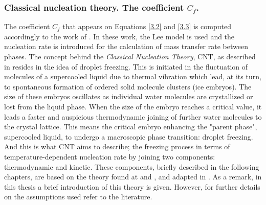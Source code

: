 \subsubsection{Classical nucleation theory. The coefficient $C_f$.}
The coefficient $C_f$ that appears on Equations \ref{3.2} and \ref{3.3} is computed accordingly to the work of \cite{huang_wang_li_2020}. In these work, the Lee model is used and the nucleation rate is introduced for the calculation of mass transfer rate between phases. 
\newline
The concept behind the \textit{Classical Nucleation Theory}, CNT, as described in \cite{ickes_welti_hoose_lohmann_2015} resides in the idea of droplet freezing. This is initiated in the fluctuation of molecules of a supercooled liquid due to thermal vibration which lead, at its turn, to spontaneous formation of ordered solid molecule clusters (ice embryos). The size of these embryos oscillates as individual water molecules are crystallized or lost from the liquid phase. When the size of the embryo reaches a critical value, it leads a faster and auspicious thermodynamic joining of further water molecules to the crystal lattice. This means the critical embryo enhancing the "parent phase", supercooled liquid, to undergo a macroscopic phase transition: droplet freezing.
\newline
And this is what CNT aims to describe; the freezing process in terms of temperature-dependent nucleation rate by joining two components: thermodynamic and kinetic. These components, briefly described in the following chapters, are based on the theory found at \cite{wu_lai_zhang_2015} and \cite{huang_wang_li_2020}, and adapted in \cite{huang_wang_li_2020}.
\newline
As a remark, in this thesis a brief introduction of this theory is given. However, for further details on the assumptions used refer to the literature.


